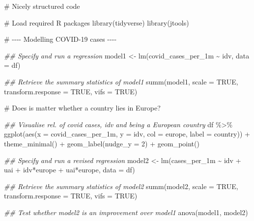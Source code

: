 \documentclass[
  letterpaper,
]{krantz}
\makeatletter
\newenvironment{Shaded}{\begin{snugshade}}{\end{snugshade}}
\newcommand{\AttributeTok}[1]{\textcolor[rgb]{0.40,0.45,0.13}{#1}}
\newcommand{\CommentTok}[1]{\textcolor[rgb]{0.37,0.37,0.37}{#1}}
\newcommand{\ConstantTok}[1]{\textcolor[rgb]{0.56,0.35,0.01}{#1}}
\newcommand{\DecValTok}[1]{\textcolor[rgb]{0.68,0.00,0.00}{#1}}
\newcommand{\DocumentationTok}[1]{\textcolor[rgb]{0.37,0.37,0.37}{\textit{#1}}}
\newcommand{\FunctionTok}[1]{\textcolor[rgb]{0.28,0.35,0.67}{#1}}
\newcommand{\NormalTok}[1]{\textcolor[rgb]{0.00,0.23,0.31}{#1}}
\newcommand{\OtherTok}[1]{\textcolor[rgb]{0.00,0.23,0.31}{#1}}
\newcommand{\SpecialCharTok}[1]{\textcolor[rgb]{0.37,0.37,0.37}{#1}}
\newenvironment{kframe}{%
\medskip{}
\setlength{\fboxsep}{.8em}
 \def\at@end@of@kframe{}%
 \ifinner\ifhmode%
  \def\at@end@of@kframe{\end{minipage}}%
  \begin{minipage}{\columnwidth}%
 \fi\fi%
 \def\FrameCommand##1{\hskip\@totalleftmargin \hskip-\fboxsep
 \colorbox{shadecolor}{##1}\hskip-\fboxsep
     \hskip-\linewidth \hskip-\@totalleftmargin \hskip\columnwidth}%
 \MakeFramed {\advance\hsize-\width
   \@totalleftmargin\z@ \linewidth\hsize
   \@setminipage}}%
 {\par\unskip\endMakeFramed%
 \at@end@of@kframe}
\renewenvironment{Shaded}{\begin{kframe}}{\end{kframe}}
\makeatother
\begin{document}
\begin{Shaded}
\begin{Highlighting}[]
\CommentTok{\# Nicely structured code}

\CommentTok{\# Load required R packages}
\FunctionTok{library}\NormalTok{(tidyverse)}
\FunctionTok{library}\NormalTok{(jtools)}

\CommentTok{\# {-}{-}{-}{-} Modelling COVID{-}19 cases {-}{-}{-}{-}}

\DocumentationTok{\#\# Specify and run a regression}
\NormalTok{model1 }\OtherTok{\textless{}{-}} \FunctionTok{lm}\NormalTok{(covid\_cases\_per\_1m }\SpecialCharTok{\textasciitilde{}}\NormalTok{ idv, }\AttributeTok{data =}\NormalTok{ df)}

\DocumentationTok{\#\# Retrieve the summary statistics of model1}
\FunctionTok{summ}\NormalTok{(model1,}
     \AttributeTok{scale =} \ConstantTok{TRUE}\NormalTok{,}
     \AttributeTok{transform.response =} \ConstantTok{TRUE}\NormalTok{,}
     \AttributeTok{vifs =} \ConstantTok{TRUE}\NormalTok{)}

\CommentTok{\# Does is matter whether a country lies in Europe?}

\DocumentationTok{\#\# Visualise rel. of covid cases, idv and being a European country}
\NormalTok{df }\SpecialCharTok{\%\textgreater{}\%}
  \FunctionTok{ggplot}\NormalTok{(}\FunctionTok{aes}\NormalTok{(}\AttributeTok{x =}\NormalTok{ covid\_cases\_per\_1m,}
             \AttributeTok{y =}\NormalTok{ idv,}
             \AttributeTok{col =}\NormalTok{ europe,}
             \AttributeTok{label =}\NormalTok{ country)) }\SpecialCharTok{+}
  \FunctionTok{theme\_minimal}\NormalTok{() }\SpecialCharTok{+}
  \FunctionTok{geom\_label}\NormalTok{(}\AttributeTok{nudge\_y =} \DecValTok{2}\NormalTok{) }\SpecialCharTok{+}
  \FunctionTok{geom\_point}\NormalTok{()}

\DocumentationTok{\#\# Specify and run a revised regression}
\NormalTok{model2 }\OtherTok{\textless{}{-}} \FunctionTok{lm}\NormalTok{(cases\_per\_1m }\SpecialCharTok{\textasciitilde{}}\NormalTok{ idv }\SpecialCharTok{+}\NormalTok{ uai }\SpecialCharTok{+}\NormalTok{ idv}\SpecialCharTok{*}\NormalTok{europe }\SpecialCharTok{+}\NormalTok{ uai}\SpecialCharTok{*}\NormalTok{europe,}
                 \AttributeTok{data =}\NormalTok{ df)}

\DocumentationTok{\#\# Retrieve the summary statistics of model2}
\FunctionTok{summ}\NormalTok{(model2,}
     \AttributeTok{scale =} \ConstantTok{TRUE}\NormalTok{,}
     \AttributeTok{transform.response =} \ConstantTok{TRUE}\NormalTok{,}
     \AttributeTok{vifs =} \ConstantTok{TRUE}\NormalTok{)}

\DocumentationTok{\#\# Test whether model2 is an improvement over model1}
\FunctionTok{anova}\NormalTok{(model1, model2)}
\end{Highlighting}
\end{Shaded}
\end{document}
